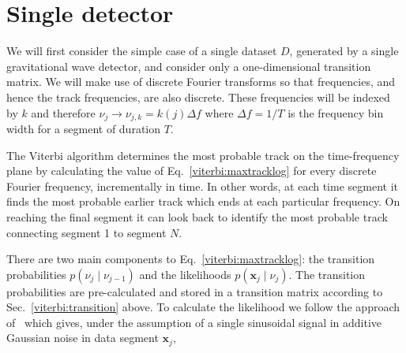 \section{\label{viterbi:single}Single detector}
%
%
We will first consider the simple case of a single dataset $D$, generated by a single gravitational wave detector, and consider only a one-dimensional transition matrix. We will make use of discrete Fourier transforms so that frequencies, and hence the track frequencies, are also discrete. These frequencies will be indexed by $k$ and therefore $\nu_j \rightarrow \nu_{j,k}=k(j)\Delta f$ where $\Delta f=1/T$ is the frequency bin width for a segment of duration $T$.

 The Viterbi algorithm determines the most probable track on the time-frequency plane by calculating the value of Eq.~\ref{viterbi:maxtracklog} for every discrete Fourier frequency, incrementally in time. In other words, at each time segment it finds the most probable earlier track which ends at each particular frequency. On reaching the final segment it can look back to identify the most probable track connecting segment 1 to segment $N$.

There are two main components to Eq.~\ref{viterbi:maxtracklog}: the transition probabilities $p(\nu_j \mid \nu_{j-1})$ and the likelihoods $p({\bm x_j} \mid \nu_j)$. The transition probabilities are pre-calculated and stored in a transition matrix according to Sec.~\ref{viterbi:transition} above. To calculate the likelihood we follow the approach of~\cite{Bretthorst1988} which gives, under the assumption of a single sinusoidal signal in additive Gaussian noise in data segment ${\bm x_j}$, 

